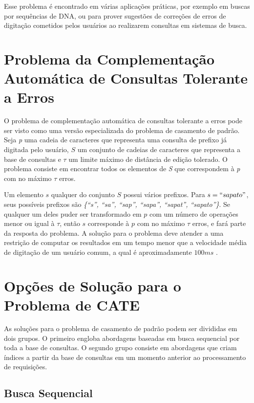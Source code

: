 Esse problema é encontrado em  várias aplicações práticas,  por exemplo em buscas por sequências de DNA, ou para prover sugestões de correções de erros de digitação cometidos pelos usuários ao realizarem consultas em sistemas de busca.

\newpage
\section{Problema da Complementação Automática de Consultas Tolerante a Erros}

O problema de complementação automática de consultas tolerante a erros pode ser visto como uma versão especializada do problema de casamento de padrão. Seja \textit{p} uma cadeia de caracteres que representa uma consulta de prefixo já digitada pelo usuário, $S$ um conjunto de cadeias de caracteres que representa a base de consultas e $\tau$ um limite máximo de distância de edição tolerado. O problema consiste em encontrar todos os elementos de \textit{S} que correspondem à \textit{p} com no máximo $\tau$ erros.

Um elemento $s$ qualquer do conjunto $S$ possui vários prefixos. Para $s = ``sapato"$, seus possíveis prefixos são \textit{\{``s'', ``sa'', ``sap'', ``sapa'', ``sapat'', ``sapato''\}}. Se qualquer um deles puder ser transformado em $p$ com um número de operações menor ou igual à $\tau$, então $s$ corresponde à $p$ com no máximo $\tau$ erros, e fará parte da resposta do problema. A solução para o problema deve atender a uma restrição de computar os resultados em um tempo menor que a velocidade média de digitação de um usuário comum, a qual é aproximadamente $100ms$ \citep{ji2009efficient}.

\section{Opções de Solução para o Problema de CATE}

As soluções para o problema de casamento de padrão podem ser divididas em dois grupos. O primeiro engloba abordagens baseadas em busca sequencial por toda a base de consultas. O segundo grupo consiste em abordagens que criam índices a partir da base de consultas em um momento anterior ao processamento de requisições. 

\subsection{Busca Sequencial}
\label{sec:sequential_search}

